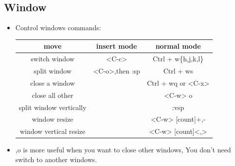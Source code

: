 \documentclass[a4paper,12pt,twoside]{book}
\begin{document}
\subsection{Window}

\begin{itemize}
		\item Control windows commands:

\begin{center}
   \begin{tabular}{c|c|c}
   \hline
		move & insert mode & normal mode \\
		
\hline 
		switch window & <C-c> &  Ctrl + w\{h,j,k,l\}\\
				
		\hline 
		split window & <C-o>,then :sp  &  Ctrl + ws\\
		
		\hline 
		close a window & & Ctrl + wq or <C-x>\\
		
		\hline 
		close all other & & <C-w> o \\

		\hline
		split window vertically	&   & :vsp \\ 

		\hline
		window resize	& &  <C-w> [count]+,- \\ 

		\hline
		window vertical resize	& &  <C-w> [count]<,> \\ 
		
\hline 
			\end{tabular}
	\end{center}

\item <C-w>,o is more useful when you want to close other windows, You don't need switch to another windows.
\end{itemize}
	
\end{document}

